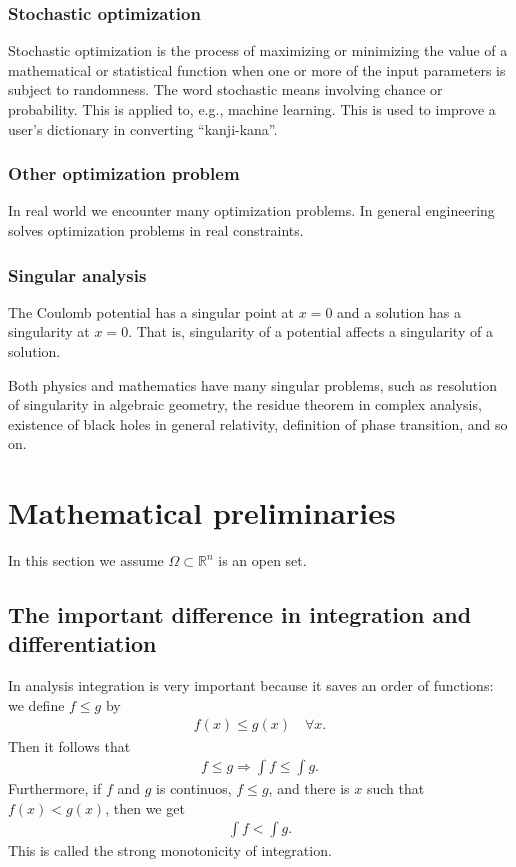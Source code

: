 \documentclass[openany, a4paper, oneside]{book}
\theoremstyle{break}
\theoremstyle{breakdefn}
\newcommand{\bbRn}{\mathbb{R}^n}
\begin{document}
\subsubsection{Stochastic optimization}
\label{sec-7-10-1-4-5}

Stochastic optimization is the process of maximizing or minimizing
the value of a mathematical or statistical function when one or more of the input parameters is subject to randomness.
The word stochastic means involving chance or probability.
This is applied to, e.g., machine learning.
This is used to improve a user's dictionary in converting ``kanji-kana''.
\subsubsection{Other optimization problem}
\label{sec-7-10-1-4-6}

In real world we encounter many optimization problems.
In general engineering solves optimization problems in real constraints.
\subsubsection{Singular analysis}
\label{sec-7-10-1-4-7}

The Coulomb potential has a singular point at $x = 0$ and a solution has a singularity at $x = 0$.
That is, singularity of a potential affects a singularity of a solution.

Both physics and mathematics have many singular problems,
such as resolution of singularity in algebraic geometry,
the residue theorem in complex analysis,
existence of black holes in general relativity, definition of phase transition, and so on.
\section{Mathematical preliminaries}
\label{sec-7-10-2}

In this section we assume $\Omega \subset \bbRn$ is an open set.
\subsection{The important difference in integration and differentiation}
\label{sec-7-10-2-1}

In analysis integration is very important because it saves an order of functions:
we define $f \leq g$ by
\begin{align}
 f (x) \leq g (x) \quad \forall x.
\end{align}
Then it follows that
\begin{align}
 f \leq g
 \Rightarrow
 \int f \leq \int g.
\end{align}
Furthermore, if $f$ and $g$ is continuos, $f \leq g$, and there is $x$ such that $f (x) < g (x)$, then we get
\begin{align}
 \int f < \int g.
\end{align}
This is called the strong monotonicity of integration.
\end{document}
